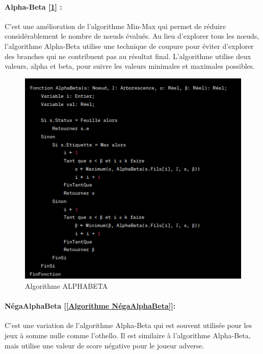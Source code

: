 \documentclass[12pt]{article}
\begin{document}
	
	
	
	\paragraph{Alpha-Beta [\ref{Algorithme ALPHABETA}] :} C'est une amélioration de l'algorithme Min-Max qui permet de réduire considérablement le nombre de nœuds évalués. Au lieu d'explorer tous les nœuds, l'algorithme Alpha-Beta utilise une technique de coupure pour éviter d'explorer des branches qui ne contribuent pas au résultat final. L'algorithme utilise deux valeurs, alpha et beta, pour suivre les valeurs minimales et maximales possibles.
	
	   
	\begin{figure}[H]
		\centering
		\includegraphics[scale=0.7]{img/alphabeta}
		\caption{Algorithme ALPHABETA }
		\label{Algorithme ALPHABETA}
	\end{figure}
	
	
		
\paragraph{	NégaAlphaBeta [\ref{Algorithme NégaAlphaBeta}]: }C'est une variation de l'algorithme Alpha-Beta qui est souvent utilisée pour les jeux à somme nulle comme l'othello. Il est similaire à l'algorithme Alpha-Beta, mais utilise une valeur de score négative pour le joueur adverse.
	
	
		   
\end{document}
